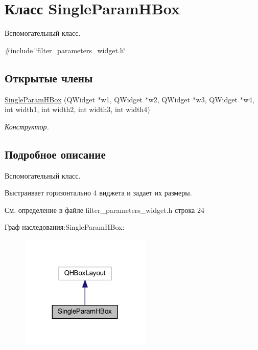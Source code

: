 \hypertarget{class_single_param_h_box}{}\section{Класс Single\+Param\+H\+Box}
\label{class_single_param_h_box}


Вспомогательный класс.  




{\ttfamily \#include \char`\"{}filter\+\_\+parameters\+\_\+widget.\+h\char`\"{}}

\subsection*{Открытые члены}
\begin{DoxyCompactItemize}
\item 
\hypertarget{class_single_param_h_box_abae6cfac3ff7ff9053a6f52772ca15f0}{}\label{class_single_param_h_box_abae6cfac3ff7ff9053a6f52772ca15f0} 
\hyperlink{class_single_param_h_box_abae6cfac3ff7ff9053a6f52772ca15f0}{Single\+Param\+H\+Box} (Q\+Widget $\ast$w1, Q\+Widget $\ast$w2, Q\+Widget $\ast$w3, Q\+Widget $\ast$w4, int width1, int width2, int width3, int width4)
\begin{DoxyCompactList}\small\item\em Конструктор. \end{DoxyCompactList}\end{DoxyCompactItemize}


\subsection{Подробное описание}
Вспомогательный класс. 

Выстраивает горизонтально 4 виджета и задает их размеры. 

См. определение в файле filter\+\_\+parameters\+\_\+widget.\+h строка 24



Граф наследования\+:Single\+Param\+H\+Box\+:
\nopagebreak
\begin{figure}[H]
\begin{center}
\leavevmode
\includegraphics[width=176pt]{class_single_param_h_box__inherit__graph}
\end{center}
\end{figure}


